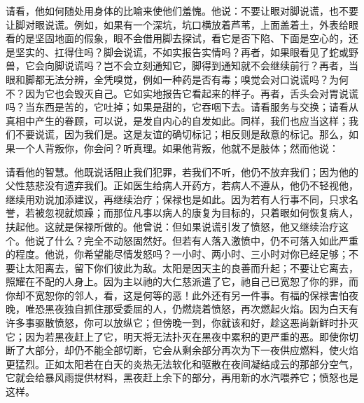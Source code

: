 请看，他如何随处用身体的比喻来使他们羞愧。他说：不要让眼对脚说谎，也不要让脚对眼说谎。例如，如果有一个深坑，坑口横放着芦苇，上面盖着土，外表给眼看的是坚固地面的假象，眼不会借用脚去探试，看它是否下陷、下面是空心的，还是坚实的、扛得住吗？脚会说谎，不如实报告实情吗？再者，如果眼看见了蛇或野兽，它会向脚说谎吗？岂不会立刻通知它，脚得到通知就不会继续前行？再者，当眼和脚都无法分辨，全凭嗅觉，例如一种药是否有毒；嗅觉会对口说谎吗？为何不？因为它也会毁灭自己。它如实地报告它看起来的样子。再者，舌头会对胃说谎吗？当东西是苦的，它吐掉；如果是甜的，它吞咽下去。请看服务与交换；请看从真相中产生的眷顾，可以说，是发自内心的自发如此。同样，我们也应当这样；我们不要说谎，因为我们是。这是友谊的确切标记；相反则是敌意的标记。那么，如果一个人背叛你，你会问？听真理。如果他背叛，他就不是肢体；然而他说：\par

\par

请看他的智慧。他既说话阻止我们犯罪，若我们不听，他仍不放弃我们；因为他的父性慈悲没有遗弃我们。正如医生给病人开药方，若病人不遵从，他仍不轻视他，继续用劝说加添建议，再继续治疗；保禄也是如此。因为若有人行事不同，只求名誉，若被忽视就烦躁；而那位凡事以病人的康复为目标的，只着眼如何恢复病人，扶起他。这就是保禄所做的。他曾说：但如果说谎引发了愤怒，他又继续治疗这个。他说了什么？完全不动怒固然好。但若有人落入激愤中，仍不可落入如此严重的程度。他说，你希望能尽情发怒吗？一小时、两小时、三小时对你已经足够；不要让太阳离去，留下你们彼此为敌。太阳是因天主的良善而升起；不要让它离去，照耀在不配的人身上。因为主以祂的大仁慈派遣了它，祂自己已宽恕了你的罪，而你却不宽恕你的邻人，看，这是何等的恶！此外还有另一件事。有福的保禄害怕夜晚，唯恐黑夜独自抓住那受委屈的人，仍燃烧着愤怒，再次燃起火焰。因为白天有许多事驱散愤怒，你可以放纵它；但傍晚一到，你就该和好，趁这恶尚新鲜时扑灭它；因为若黑夜赶上了它，明天将无法扑灭在黑夜中累积的更严重的恶。即使你切断了大部分，却仍不能全部切断，它会从剩余部分再次为下一夜供应燃料，使火焰更猛烈。正如太阳若在白天的炎热无法软化和驱散在夜间凝结成云的那部分空气，它就会给暴风雨提供材料，黑夜赶上余下的部分，再用新的水汽喂养它；愤怒也是这样。\par

\par

